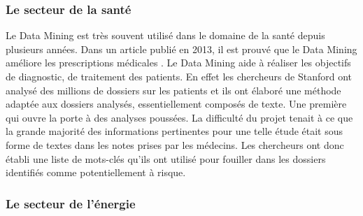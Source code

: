 \documentclass[11pt,a4paper]{report}
\begin{document}
\subsubsection{Le secteur de la santé}
Le Data Mining est très souvent utilisé dans le domaine de la santé depuis plusieurs années. Dans un article publié en 2013, il est prouvé que le Data Mining améliore les prescriptions médicales \cite{medecine}. Le Data Mining aide à réaliser les objectifs de diagnostic, de traitement des patients. 
En effet les chercheurs de Stanford ont analysé des millions de dossiers sur les patients et ils ont élaboré une méthode adaptée aux dossiers analysés, essentiellement composés de texte. Une première qui ouvre la porte à des analyses poussées. La difficulté du projet tenait à ce que la grande majorité des informations pertinentes pour une telle étude était sous forme de textes dans les notes prises par les médecins. Les chercheurs ont donc établi une liste de mots-clés qu’ils ont utilisé pour fouiller dans les dossiers identifiés comme potentiellement à risque.


%
%

\subsubsection{Le secteur de l'énergie}
\end{document}
